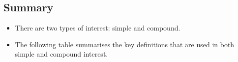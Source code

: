             \subsection{ Summary}
            \nopagebreak
            \label{m39335*eip-923}\begin{itemize}[noitemsep]
            \item There are two types of interest: simple and compound.\item The following table summarises the key definitions that are used in both simple and compound interest.

    
      
    
    \setlength\mytablespace{4\tabcolsep}
    \addtolength\mytablespace{3\arrayrulewidth}
    \setlength\mytablewidth{\linewidth}
        
    
    \setlength\mytableroom{\mytablewidth}
    \addtolength\mytableroom{-\mytablespace}
    
    \setlength\myfixedwidth{0pt}
    \setlength\mystarwidth{\mytableroom}
        \addtolength\mystarwidth{-\myfixedwidth}
        \divide{}
        
    
\end{itemize}
